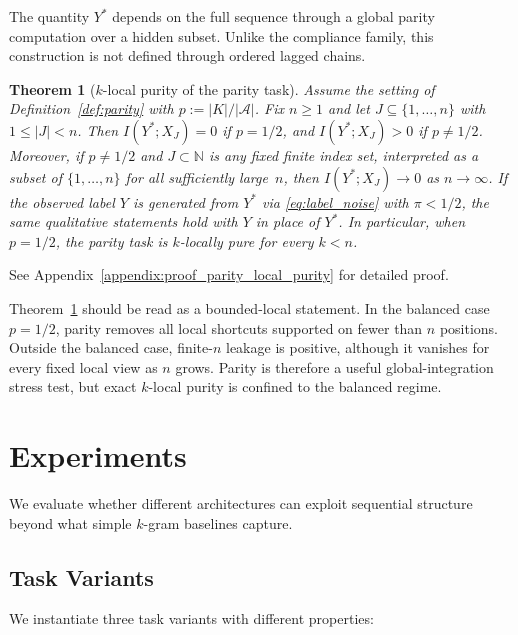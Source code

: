 \documentclass{article}
\theoremstyle{plain}
\newtheorem{theorem}{Theorem}[section]
\theoremstyle{definition}
\theoremstyle{remark}
\begin{document}
The quantity $Y^*$ depends on the full sequence through a global parity
computation over a hidden subset. Unlike the compliance family, this
construction is not defined through ordered lagged chains.

\begin{theorem}[$k$-local purity of the parity task]
\label{thm:parity_local_purity}
Assume the setting of Definition~\ref{def:parity} with
$p := |K|/|\mathcal{A}|$.
Fix $n\ge 1$ and let
$J \subseteq \{1,\ldots,n\}$ with $1 \le |J| < n$.
Then $I(Y^*;X_J)=0$ if $p = 1/2$, and $I(Y^*;X_J)>0$ if
$p \neq 1/2$.
Moreover, if $p\neq 1/2$ and $J\subset \mathbb{N}$ is any fixed
finite index set, interpreted as a subset of $\{1,\ldots,n\}$ for
all sufficiently large~$n$, then $I(Y^*;X_J)\to 0$ as
$n\to\infty$.
If the observed label $Y$ is generated from $Y^*$ via
\eqref{eq:label_noise} with $\pi<1/2$, the same qualitative
statements hold with $Y$ in place of $Y^*$. In particular, when
$p=1/2$, the parity task is $k$-locally pure for every $k<n$.
\end{theorem}

See Appendix~\ref{appendix:proof_parity_local_purity} for detailed proof.

Theorem~\ref{thm:parity_local_purity} should be read as a bounded-local
statement. In the balanced case $p=1/2$, parity removes all local shortcuts
supported on fewer than $n$ positions. Outside the balanced case, finite-$n$
leakage is positive, although it vanishes for every fixed local view as $n$
grows. Parity is therefore a useful global-integration stress test, but
exact $k$-local purity is confined to the balanced regime.


\section{Experiments}
\label{sec:experiments}

We evaluate whether different architectures can exploit sequential structure beyond what simple $k$-gram baselines capture.

\subsection{Task Variants}
\label{sec:task_variants}

We instantiate three task variants with different properties:
\end{document}
